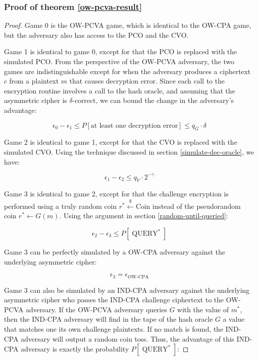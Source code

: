 \documentclass{article}
\newcommand{\leftsample}{\overset{{\scriptscriptstyle\$}}{\leftarrow}}
\begin{document}
\subsubsection{Proof of theorem \ref{ow-pcva-result}}
\begin{proof}
    Game 0 is the OW-PCVA game, which is identical to the OW-CPA game, but the adversary also has access to the PCO and the CVO.

    Game 1 is identical to game 0, except for that the PCO is replaced with the simulated PCO. From the perspective of the OW-PCVA adversary, the two games are indistinguishable except for when the adversary produces a ciphertext $c$ from a plaintext $m$ that causes decryption error. Since each call to the encryption routine involves a call to the hash oracle, and assuming that the asymmetric cipher is $\delta$-correct, we can bound the change in the adversary's advantage:

    \begin{equation*}
        \epsilon_0 - \epsilon_1 
        \leq P[\text{at least one decryption error}]
        \leq q_G \cdot \delta
    \end{equation*}

    Game 2 is identical to game 1, except for that the CVO is replaced with the simulated CVO. Using the technique discussed in section \ref{simulate-dec-oracle}, we have:

    \begin{equation*}
        \epsilon_1 - \epsilon_2 \leq q_V \cdot 2^{-\gamma}
    \end{equation*}

    Game 3 is identical to game 2, except for that the challenge encryption is performed using a truly random coin $r^\ast \leftsample \text{Coin}$ instead of the pseudorandom coin $r^\ast \leftarrow G(m)$. Using the argument in section \ref{random-until-queried}:

    \begin{equation*}
        \epsilon_2 - \epsilon_3 \leq P[\operatorname{QUERY}^\ast]
    \end{equation*}

    Game 3 can be perfectly simulated by a OW-CPA adversary against the underlying asymmetric cipher:

    \begin{equation*}
        \epsilon_3 = \epsilon_\text{OW-CPA}
    \end{equation*}

    Game 3 can also be simulated by an IND-CPA adversary against the underlying asymmetric cipher who passes the IND-CPA challenge ciphertext to the OW-PCVA adversary. If the OW-PCVA adversary queries $G$ with the value of $m^\ast$, then the IND-CPA adversary will find in the tape of the hash oracle $G$ a value that matches one its own challenge plaintexts. If no match is found, the IND-CPA adversary will output a random coin toss. Thus, the advantage of this IND-CPA adversary is exactly the probability $P[\operatorname{QUERY}^\ast]$:


\end{proof}
\end{document}
